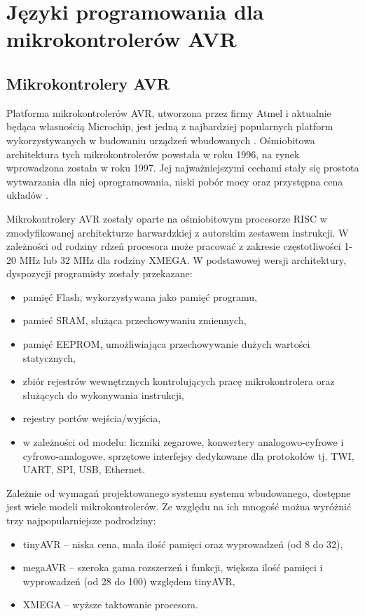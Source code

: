 \chapter{Języki programowania dla mikrokontrolerów AVR}
\label{ch:02}



\section{Mikrokontrolery AVR}
Platforma mikrokontrolerów AVR, utworzona przez firmy Atmel i aktualnie będąca własnością Microchip, jest jedną z najbardziej popularnych platform wykorzystywanych w budowaniu urządzeń wbudowanych . Ośmiobitowa architektura tych mikrokontrolerów powstała w roku 1996, na rynek wprowadzona została w roku 1997. Jej najważniejszymi cechami stały się prostota wytwarzania dla niej oprogramowania, niski pobór mocy oraz przystępna cena układów .

Mikrokontrolery AVR zostały oparte na ośmiobitowym procesorze RISC w zmodyfikowanej architekturze harwardzkiej z autorskim zestawem instrukcji. W zależności od rodziny rdzeń procesora może pracować z zakresie częstotliwości 1-20 MHz lub 32 MHz dla rodziny XMEGA.
W podstawowej wersji architektury, dyspozycji programisty zostały przekazane:
\begin{itemize}
\item pamięć Flash, wykorzystywana jako pamięć programu,
\item pamieć SRAM, służąca przechowywaniu zmiennych,
\item pamięć EEPROM, umożliwiająca przechowywanie dużych wartości statycznych,
\item zbiór rejestrów wewnętrznych kontrolujących pracę mikrokontrolera oraz służących do wykonywania instrukcji,
\item rejestry portów wejścia/wyjścia,
\item w zależności od modelu: liczniki zegarowe, konwertery analogowo-cyfrowe i cyfrowo-analogowe, sprzętowe interfejsy dedykowane dla protokołów tj. TWI, UART, SPI, USB, Ethernet.
\end{itemize}

Zależnie od wymagań projektowanego systemu systemu wbudowanego, dostępne jest wiele modeli mikrokontrolerów. Ze względu na ich mnogość można wyróżnić trzy najpopularniejsze podrodziny:
\begin{itemize}
\item tinyAVR -- niska cena, mała ilość pamięci oraz wyprowadzeń (od 8 do 32),
\item megaAVR -- szeroka gama rozszerzeń i funkcji, większa ilość pamięci i wyprowadzeń (od 28 do 100) względem tinyAVR,
\item XMEGA -- wyższe taktowanie procesora.
\end{itemize}

